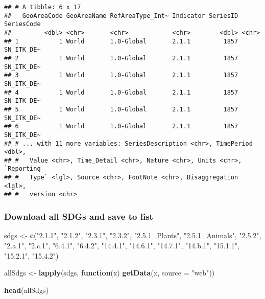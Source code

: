 \documentclass[]{article}
\newenvironment{Shaded}{\begin{snugshade}}{\end{snugshade}}
\newcommand{\KeywordTok}[1]{\textcolor[rgb]{0.13,0.29,0.53}{\textbf{#1}}}
\newcommand{\DataTypeTok}[1]{\textcolor[rgb]{0.13,0.29,0.53}{#1}}
\newcommand{\StringTok}[1]{\textcolor[rgb]{0.31,0.60,0.02}{#1}}
\newcommand{\ControlFlowTok}[1]{\textcolor[rgb]{0.13,0.29,0.53}{\textbf{#1}}}
\newcommand{\NormalTok}[1]{#1}
\begin{document}
\begin{verbatim}
## # A tibble: 6 x 17
##   GeoAreaCode GeoAreaName RefAreaType_Int~ Indicator SeriesID SeriesCode
##         <dbl> <chr>       <chr>            <chr>        <dbl> <chr>     
## 1           1 World       1.0-Global       2.1.1         1857 SN_ITK_DE~
## 2           1 World       1.0-Global       2.1.1         1857 SN_ITK_DE~
## 3           1 World       1.0-Global       2.1.1         1857 SN_ITK_DE~
## 4           1 World       1.0-Global       2.1.1         1857 SN_ITK_DE~
## 5           1 World       1.0-Global       2.1.1         1857 SN_ITK_DE~
## 6           1 World       1.0-Global       2.1.1         1857 SN_ITK_DE~
## # ... with 11 more variables: SeriesDescription <chr>, TimePeriod <dbl>,
## #   Value <chr>, Time_Detail <chr>, Nature <chr>, Units <chr>, `Reporting
## #   Type` <lgl>, Source <chr>, FootNote <chr>, Disaggregation <lgl>,
## #   version <chr>
\end{verbatim}

\subsubsection{Download all SDGs and save to
list}\label{download-all-sdgs-and-save-to-list}

\begin{Shaded}
\begin{Highlighting}[]
\NormalTok{sdgs <-}\StringTok{ }\KeywordTok{c}\NormalTok{(}\StringTok{"2.1.1"}\NormalTok{,}
          \StringTok{"2.1.2"}\NormalTok{,}
          \StringTok{"2.3.1"}\NormalTok{,}
          \StringTok{"2.3.2"}\NormalTok{,}
          \StringTok{"2.5.1_Plants"}\NormalTok{,}
          \StringTok{"2.5.1_Animals"}\NormalTok{,}
          \StringTok{"2.5.2"}\NormalTok{,}
          \StringTok{"2.a.1"}\NormalTok{,}
          \StringTok{"2.c.1"}\NormalTok{,}
          \StringTok{"6.4.1"}\NormalTok{,}
          \StringTok{"6.4.2"}\NormalTok{,}
          \StringTok{"14.4.1"}\NormalTok{,}
          \StringTok{"14.6.1"}\NormalTok{,}
          \StringTok{"14.7.1"}\NormalTok{,}
          \StringTok{"14.b.1"}\NormalTok{,}
          \StringTok{"15.1.1"}\NormalTok{,}
          \StringTok{"15.2.1"}\NormalTok{,}
          \StringTok{"15.4.2"}\NormalTok{)}

\NormalTok{allSdgs <-}\StringTok{ }\KeywordTok{lapply}\NormalTok{(sdgs, }\ControlFlowTok{function}\NormalTok{(x) }\KeywordTok{getData}\NormalTok{(x, }\DataTypeTok{source =} \StringTok{"web"}\NormalTok{))}

\KeywordTok{head}\NormalTok{(allSdgs)}
\end{Highlighting}
\end{Shaded}
\end{document}
